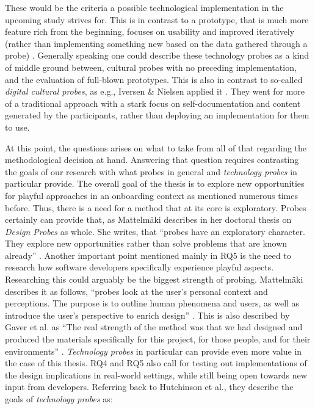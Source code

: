 These would be the criteria a possible technological implementation in the upcoming study strives for. This is in contrast to a prototype, that is much more feature rich from the beginning, focuses on usability and improved iteratively (rather than implementing something new based on the data gathered through a probe) \cite[p. 18-19]{hutchinson2003technology}. Generally speaking one could describe these technology probes as a kind of middle ground between, cultural probes with no preceding implementation, and the evaluation of full-blown prototypes. This is also in contrast to so-called \textit{digital cultural probes}, as e.g., Iversen \& Nielsen applied it \cite{iversen2003using}. They went for more of a traditional approach with a stark focus on self-documentation and content generated by the participants, rather than deploying an implementation for them to use.

At this point, the questions arises on what to take from all of that regarding the methodological decision at hand. Answering that question requires contrasting the goals of our research with what probes in general and \textit{technology probes} in particular provide. The overall goal of the thesis is to explore new opportunities for playful approaches in an onboarding context as mentioned numerous times before. Thus, there is a need for a method that at its core is exploratory. Probes  certainly can provide that, as Mattelmäki describes in her doctoral thesis on \textit{Design Probes} as whole. She writes, that \enquote{probes have an exploratory character. They explore new opportunities rather than solve problems that are known already} \cite[p. 40]{mattelmaki2006design}. Another important point mentioned mainly in RQ5 is the need to research how software developers specifically experience playful aspects. Researching this could arguably be the biggest strength of probing. Mattelmäki describes it as follows, \enquote{probes look at the user’s personal context and perceptions. The purpose is to outline human phenomena and users, as well as introduce the user’s perspective to enrich design} \cite[p. 40]{mattelmaki2006design}. This is also described by Gaver et al. as \enquote{The real strength of the method was that we had designed and produced the materials specifically for this project, for those people, and for their environments} \cite[p. 29]{gaver1999design}. \textit{Technology probes} in particular can provide even more value in the case of this thesis. RQ4 and RQ5 also call for testing out implementations of the design implications in real-world settings, while still being open towards new input from developers. Referring back to Hutchinson et al., they describe the goals of \textit{technology probes} as:

